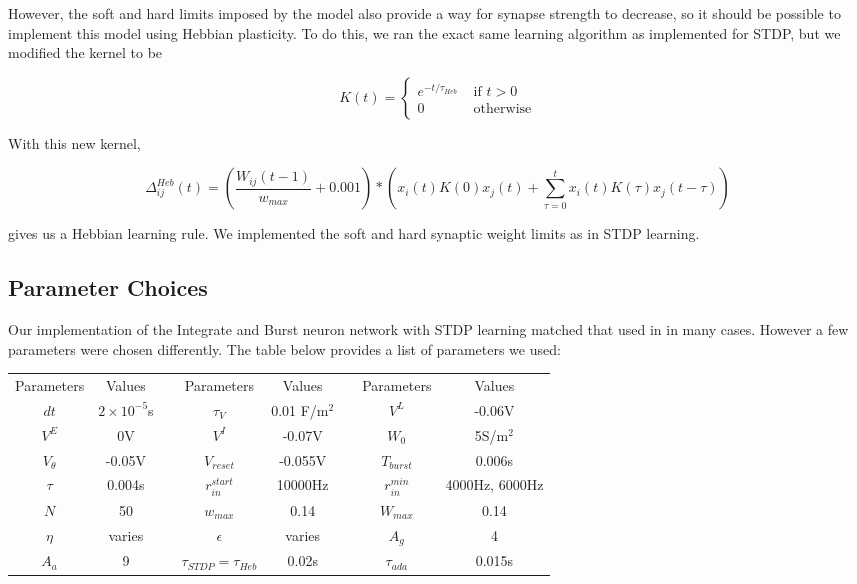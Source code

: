 However, the soft and hard limits imposed by the model also provide a way for synapse strength to decrease, so it should be possible to implement this model using Hebbian plasticity. To do this, we ran the exact same learning algorithm as implemented for STDP, but we modified the kernel to be

\[K(t) = 
\begin{cases}
e^{-t/\tau_{Heb}} &\text{ if } t > 0\\
0 &\text{ otherwise}
\end{cases}
\]

With this new kernel, 

\begin{equation}
\Delta^{Heb}_{ij}(t) = \left(\frac{W_{ij}(t-1)}{w_{max}} + 0.001\right)*\left(x_i(t)K(0)x_j(t) + \sum_{\tau = 0}^t  x_i(t)K(\tau)x_j(t -\tau)\right)
\label{Heb}
\end{equation}

gives us a Hebbian learning rule. We implemented the soft and hard synaptic weight limits as in STDP learning.

\subsection{Parameter Choices}

Our implementation of the Integrate and Burst neuron network with STDP learning matched that used in \cite{Fiete} in many cases. However a few parameters were chosen differently. The table below provides a list of parameters we used:

\begin{center}
\begin{tabular}{|c|c|p{0.5cm}|c|c|p{0.5 cm}|c|c|}
\cline{1-2}\cline{4-5}\cline{7-8}
Parameters & Values & & Parameters & Values& & Parameters& Values\\

\cline{1-2}\cline{4-5}\cline{7-8}
\(dt\) & \(2 \times 10^{-5}\)s& & \(\tau_V\) & 0.01 F/m\(^2\)& &\(V^L\) & -0.06V\\

\cline{1-2}\cline{4-5}\cline{7-8}
\(V^E\) & 0V& & \(V^I\) & -0.07V& & \(W_0\) & 5S/m\(^2\)\\

\cline{1-2}\cline{4-5}\cline{7-8}
\(V_{\theta}\) & -0.05V & & \(V_{reset}\) & -0.055V & & \(T_{burst}\) & 0.006s\\

\cline{1-2}\cline{4-5}\cline{7-8}
\(\tau\) & 0.004s & & \(r_{in}^{start}\) & 10000Hz & & \(r_{in}^{min}\) & 4000Hz, 6000Hz\\

\cline{1-2}\cline{4-5}\cline{7-8}
\(N\) & 50 & & \(w_{max}\) & 0.14 & & \(W_{max}\) & 0.14\\

\cline{1-2}\cline{4-5}\cline{7-8}
\(\eta\) & varies & & \(\epsilon\) & varies & & \(A_g\) & 4\\

\cline{1-2}\cline{4-5}\cline{7-8}
\(A_a\) & 9 & & \(\tau_{STDP}= \tau_{Heb}\) & 0.02s & & \(\tau_{ada}\) & 0.015s\\
\cline{1-2}\cline{4-5}\cline{7-8}
\end{tabular}
\end{center}